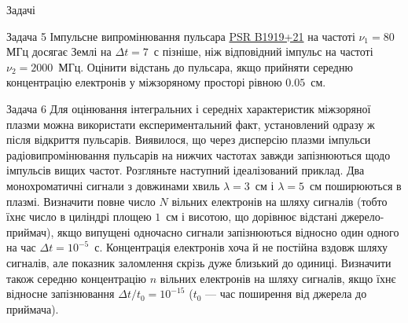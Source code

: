 \documentclass[]{beamer}
\begin{document}
\begin{frame}{Задачі}{}
\begin{onlyenv}
		\begin{exampleblock}{\scriptsize\color{blue} Задача 5}\scriptsize\justifying%
			Імпульсне випромінювання пульсара \href{https://en.wikipedia.org/wiki/PSR\_B1919\%2B21}{\color{blue} PSR B1919+21} на частоті $\nu_1 =80 $ МГц досягає Землі на $\Delta t = 7$~с пізніше, ніж відповідний імпульс на частоті $\nu_2 = 2000 $~МГц. Оцінити відстань до пульсара, якщо прийняти середню концентрацію електронів у міжзоряному просторі рівною $0.05$~см.
		\end{exampleblock}
		\begin{exampleblock}{\scriptsize\color{blue} Задача 6}\scriptsize\justifying%
			Для оцінювання інтегральних і середніх характеристик міжзоряної плазми можна використати експериментальний факт, установлений одразу ж після відкриття пульсарів. Виявилося, що через дисперсію плазми імпульси радіовипромінювання пульсарів на нижчих частотах завжди запізнюються щодо імпульсів вищих частот. Розгляньте наступ\-ний ідеалізований приклад. Два монохроматичні сигнали з довжинами хвиль $\lambda = 3$~см і $\lambda = 5$~см поширюються в плазмі. Визначити повне число $N$ вільних електронів на шляху сигналів (тобто їхнє число в циліндрі площею $1$~см і висотою, що дорівнює відстані джерело-приймач), якщо випущені одночасно сигнали запізнюються відносно один одного на час $\Delta t = 10^{-5}$~с. Концентрація електронів хоча й не постійна вздовж шляху сигналів, але показник заломлення скрізь дуже близький до одиниці. Визначити також середню концентрацію $n$ вільних електронів на шляху сигналів, якщо їхнє відносне запізнювання $\Delta t/t_0 = 10^{-15}$ ($t_0$ --- час поширення від джерела до приймача).
		\end{exampleblock}
	\end{onlyenv}
\end{frame}
\end{document}
